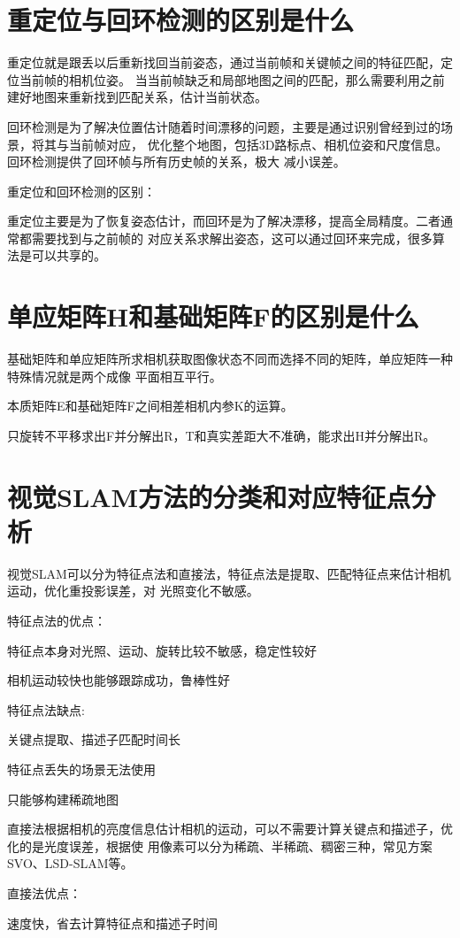 \documentclass[10pt]{article}
\begin{document}
\tableofcontents
{}
\section{重定位与回环检测的区别是什么}
重定位就是跟丢以后重新找回当前姿态，通过当前帧和关键帧之间的特征匹配，定位当前帧的相机位姿。
当当前帧缺乏和局部地图之间的匹配，那么需要利用之前建好地图来重新找到匹配关系，估计当前状态。

回环检测是为了解决位置估计随着时间漂移的问题，主要是通过识别曾经到过的场景，将其与当前帧对应，
优化整个地图，包括3D路标点、相机位姿和尺度信息。回环检测提供了回环帧与所有历史帧的关系，极大
减小误差。

重定位和回环检测的区别：

重定位主要是为了恢复姿态估计，而回环是为了解决漂移，提高全局精度。二者通常都需要找到与之前帧的
对应关系求解出姿态，这可以通过回环来完成，很多算法是可以共享的。
\section{单应矩阵H和基础矩阵F的区别是什么}
基础矩阵和单应矩阵所求相机获取图像状态不同而选择不同的矩阵，单应矩阵一种特殊情况就是两个成像
平面相互平行。

本质矩阵E和基础矩阵F之间相差相机内参K的运算。

只旋转不平移求出F并分解出R，T和真实差距大不准确，能求出H并分解出R。
\section{视觉SLAM方法的分类和对应特征点分析}
视觉SLAM可以分为特征点法和直接法，特征点法是提取、匹配特征点来估计相机运动，优化重投影误差，对
光照变化不敏感。

\noindent 特征点法的优点：

特征点本身对光照、运动、旋转比较不敏感，稳定性较好

相机运动较快也能够跟踪成功，鲁棒性好

\noindent 特征点法缺点:

关键点提取、描述子匹配时间长

特征点丢失的场景无法使用

只能够构建稀疏地图

直接法根据相机的亮度信息估计相机的运动，可以不需要计算关键点和描述子，优化的是光度误差，根据使
用像素可以分为稀疏、半稀疏、稠密三种，常见方案SVO、LSD-SLAM等。

\noindent 直接法优点：

速度快，省去计算特征点和描述子时间
\end{document}
